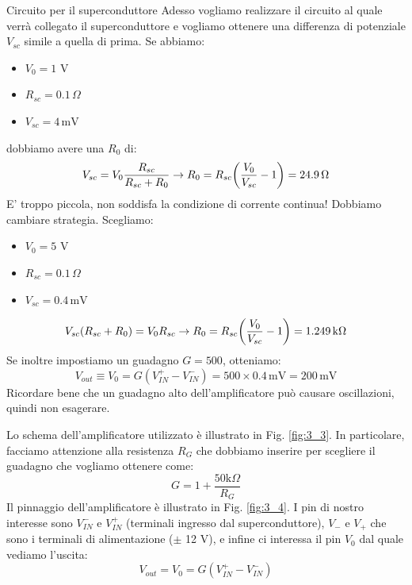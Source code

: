 \documentclass[../main/main.tex]{subfiles}
\begin{document}
\begin{example}{Circuito per il superconduttore}{}
Adesso vogliamo realizzare il circuito al quale verrà collegato il superconduttore e vogliamo ottenere una differenza di potenziale \( V_{sc} \) simile a quella di prima. Se abbiamo:
\begin{itemize}
\item \( V_0 = 1 \) V
\item \( R_{sc} = 0.1\, \Omega \)
\item \( V_{sc} = 4 \,\text{mV}  \)
\end{itemize}
dobbiamo avere una \( R_0 \) di:
\begin{equation*}
   V_{sc} = V_0 \frac{R_{sc}}{R_{sc}+R_0} \rightarrow R_0 = R_{sc} \qty(\frac{V_0}{V_{sc}} -1) = 24.9 \, \Omega
\end{equation*}
E' troppo piccola, non soddisfa la condizione di corrente continua!
Dobbiamo cambiare strategia. Scegliamo:
\begin{itemize}
\item \( V_0 = 5 \) V
\item \( R_{sc} = 0.1 \, \Omega \)
\item \( V_{sc} = 0.4 \,\text{mV}  \)
\end{itemize}
\begin{equation*}
  V_{sc} (R_{sc} + R_0) = V_0 R_{sc} \rightarrow R_0 = R_{sc} \qty(\frac{V_0}{V_{sc}} -1) = 1.249 \, \text{k}\Omega
\end{equation*}
Se inoltre impostiamo un guadagno \( G = 500 \), otteniamo:
\begin{equation*}
  V_{out} \equiv V_0 = G(V_{IN}^+ - V_{IN}^-) = 500 \times 0.4 \,\text{mV} = 200 \,\text{mV}
\end{equation*}
Ricordare bene che un guadagno alto dell'amplificatore può causare oscillazioni, quindi non esagerare.
\end{example}

Lo schema dell'amplificatore utilizzato è illustrato in Fig. \ref{fig:3_3}. In particolare, facciamo attenzione alla resistenza \( R_G \) che dobbiamo inserire per scegliere il guadagno che vogliamo ottenere come:
\begin{equation*}
  G = 1 + \frac{50 \text{k} \Omega}{R_G}
\end{equation*}
Il pinnaggio dell'amplificatore è illustrato in Fig. \ref{fig:3_4}. I pin di nostro interesse sono \( V_{IN}^- \) e \( V_{IN}^+ \) (terminali ingresso dal superconduttore), \( V_- \) e \( V_+ \) che sono i terminali di alimentazione (\( \pm \) 12 V), e infine ci interessa il pin \( V_0 \) dal quale vediamo l'uscita:
\begin{equation*}
  V_{out} = V_0 = G(V_{IN}^+ - V_{IN}^-)
\end{equation*}
\end{document}
